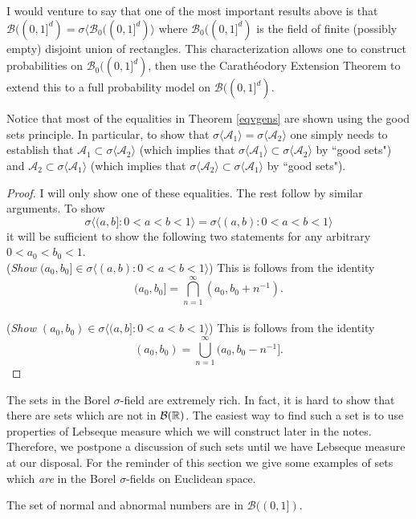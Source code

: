 I would venture to say that one of the most important results above is that $\mathcal B((0,1]^d) = \sigma\bigl\langle  \mathcal B_0((0,1]^d)  \bigr\rangle$ where $\mathcal B_0((0,1]^d)$ is the field of finite (possibly empty) disjoint union of rectangles. This characterization allows one to construct probabilities on $\mathcal B_0((0,1]^d)$, then use the Carath\'eodory Extension Theorem to extend this to a full probability model on $\mathcal B((0,1]^d)$.

Notice that most of the equalities in Theorem \ref{eqvgens} are shown using the good sets principle. In particular, to show that $\sigma\langle \mathcal A_1\rangle=\sigma\langle\mathcal A_2 \rangle$ one simply needs to establish that $ \mathcal A_1 \subset \sigma\langle \mathcal A_2\rangle$ (which implies that $ \sigma\langle \mathcal A_1\rangle \subset \sigma\langle \mathcal A_2\rangle$ by ``good sets") and $ \mathcal A_2 \subset \sigma\langle \mathcal A_1\rangle$ (which implies that $ \sigma\langle \mathcal A_2\rangle \subset \sigma\langle \mathcal A_1\rangle$ by ``good sets").

\begin{proof}
I will only show one of these equalities. The rest follow by similar arguments.
To show
\[ \sigma\bigl\langle (a,b]: 0< a < b < 1 \bigr\rangle =\sigma\bigl\langle (a,b): 0< a < b <1  \bigr\rangle\]
it will be sufficient to show the following two statements for any arbitrary $0<a_0<b_0<1$.
\\
\textbullet({\sl Show $(a_0,b_0]\in \sigma\langle (a,b):0<a<b<1\rangle$})
This is follows from the identity
\[(a_0,b_0] = \bigcap_{n=1}^\infty (a_0,b_0+n^{-1} ).  \]
\\
\textbullet({\sl Show $(a_0,b_0)\in \sigma\langle (a,b]:0<a<b<1\rangle$})
This is follows from the identity
\[(a_0,b_0) = \bigcup_{n=1}^\infty (a_0,b_0-n^{-1}  ].  \]
\end{proof}

The sets in the Borel $\sigma$-field are extremely rich. In fact, it is hard to show that there are sets which are not in $\mathcal B(\Bbb R)$. The easiest way to find such a set is to use properties of Lebseque measure which we will construct later in the notes. Therefore, we postpone a discussion of such sets until	 we have Lebseque measure at our disposal. For the reminder of this section we give some examples of sets which {\em are} in the Borel $\sigma$-fields on Euclidean space.

\begin{example}
The set of normal and abnormal numbers are in $\mathcal B((0,1])$.
\end{example}


